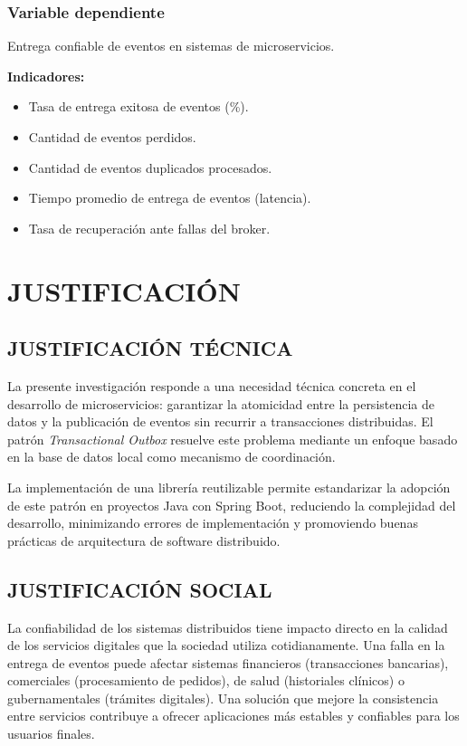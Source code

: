 \subsubsection{Variable dependiente}

Entrega confiable de eventos en sistemas de microservicios.

\textbf{Indicadores:}
\begin{itemize}
    \item Tasa de entrega exitosa de eventos (\%).
    \item Cantidad de eventos perdidos.
    \item Cantidad de eventos duplicados procesados.
    \item Tiempo promedio de entrega de eventos (latencia).
    \item Tasa de recuperación ante fallas del broker.
\end{itemize}

\section{JUSTIFICACIÓN}

\subsection{JUSTIFICACIÓN TÉCNICA}

La presente investigación responde a una necesidad técnica concreta en el desarrollo de microservicios: garantizar la atomicidad entre la persistencia de datos y la publicación de eventos sin recurrir a transacciones distribuidas. El patrón \textit{Transactional Outbox} resuelve este problema mediante un enfoque basado en la base de datos local como mecanismo de coordinación.

La implementación de una librería reutilizable permite estandarizar la adopción de este patrón en proyectos Java con Spring Boot, reduciendo la complejidad del desarrollo, minimizando errores de implementación y promoviendo buenas prácticas de arquitectura de software distribuido.

\subsection{JUSTIFICACIÓN SOCIAL}

La confiabilidad de los sistemas distribuidos tiene impacto directo en la calidad de los servicios digitales que la sociedad utiliza cotidianamente. Una falla en la entrega de eventos puede afectar sistemas financieros (transacciones bancarias), comerciales (procesamiento de pedidos), de salud (historiales clínicos) o gubernamentales (trámites digitales). Una solución que mejore la consistencia entre servicios contribuye a ofrecer aplicaciones más estables y confiables para los usuarios finales.

